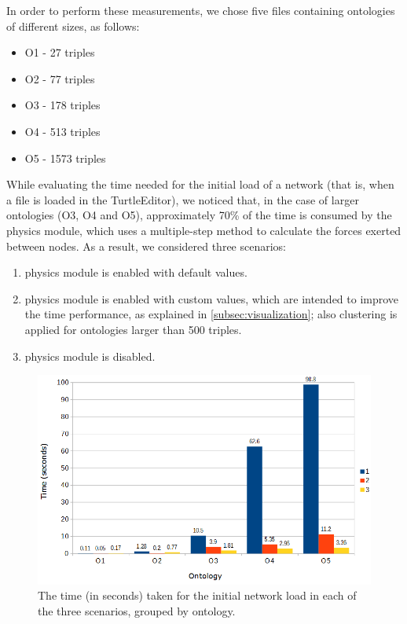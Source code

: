 In order to perform these measurements, we chose five files containing ontologies of different sizes, as follows:

\begin{itemize}
	\item O1 - 27 triples
	\item O2 - 77 triples
	\item O3 - 178 triples
	\item O4 - 513 triples
	\item O5 - 1573 triples
\end{itemize}

While evaluating the time needed for the initial load of a network (that is, when a file is loaded in the TurtleEditor), we noticed that, in the case of larger ontologies (O3, O4 and O5), approximately 70\% of the time is consumed by the physics module, which uses a multiple-step method to calculate the forces exerted between nodes. As a result, we considered three scenarios:

\begin{enumerate}
	\item physics module is enabled with default values.
	\item physics module is enabled with custom values, which are intended to improve the time performance, as explained in \autoref{subsec:visualization}; also clustering is applied for ontologies larger than 500 triples. 
	\item physics module is disabled.
\end{enumerate}

\begin{figure}[htb]
	\centering
  	\centerline{\includegraphics[width = \textwidth]{img/initial_load.png}}
	\caption{The time (in seconds) taken for the initial network load in each of the three scenarios, grouped by ontology.}
	\label{img:initial_load}
\end{figure}

